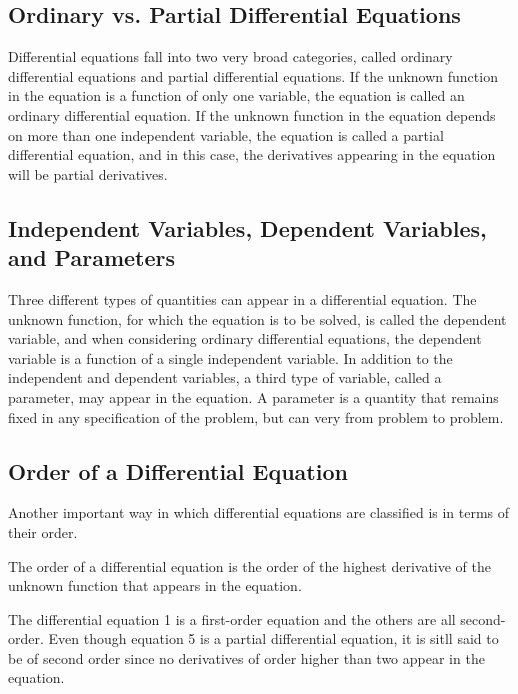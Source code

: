   \subsection{Ordinary vs. Partial Differential Equations}

    Differential equations fall into two very broad categories, called ordinary differential equations and partial differential equations. If the unknown function in the equation is a function of only one variable, the equation is called an ordinary differential equation. If the unknown function in the equation depends on more than one independent variable, the equation is called a partial differential equation, and in this case, the derivatives appearing in the equation will be partial derivatives.

  \subsection{Independent Variables, Dependent Variables, and Parameters}

   Three different types of quantities can appear in a differential equation. The unknown function, for which the equation is to be solved, is called the dependent variable, and when considering ordinary differential equations, the dependent variable is a function of a single independent variable. In addition to the independent and dependent variables, a third type of variable, called a parameter, may appear in the equation. A parameter is a quantity that remains fixed in any specification of the problem, but can very from problem to problem.
  
  \subsection{Order of a Differential Equation}

    Another important way in which differential equations are classified is in terms of their order.

    \begin{definition}
      The order of a differential equation is the order of the highest derivative of the unknown function that appears in the equation.
    \end{definition}

    The differential equation 1 is a first-order equation and the others are all second-order. Even though equation 5 is a partial differential equation, it is sitll said to be of second order since no derivatives of order higher than two appear in the equation.

